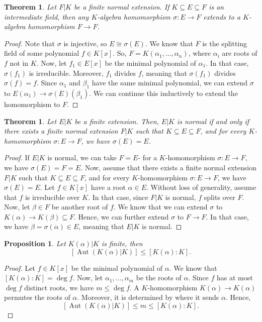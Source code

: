 \documentclass[a4paper, openany]{memoir}
\theoremstyle{definition}
\theoremstyle{plain}
\newtheorem{theorem}[definition]{Theorem}
\newtheorem{proposition}[definition]{Proposition}
\begin{document}
    \begin{theorem}
        Let $F|K$ be a finite normal extension. If $K \subseteq E \subseteq F$ is an intermediate field, then any $K$-algebra homomorphism $\sigma \colon E \to F$ extends to a $K$-algebra homomorphism $F \to F$.
    \end{theorem}
    \begin{proof}
        Note that $\sigma$ is injective, so $E \cong \sigma(E)$. We know that $F$ is the splitting field of some polynomial $f \in K[x]$. So, $F = K(\alpha_1, \dots, \alpha_n)$, where $\alpha_i$ are roots of $f$ not in $K$. Now, let $f_1 \in E[x]$ be the minimal polynomial of $\alpha_1$. In that case, $\sigma(f_1)$ is irreducible. Moreover, $f_1$ divides $f$, meaning that $\sigma(f_1)$ divides $\sigma(f) = f$. Since $\alpha_1$ and $\beta_1$ have the same minimal polynomial, we can extend $\sigma$ to $E(\alpha_1) \to \sigma(E)(\beta_1)$. We can continue this inductively to extend the homomorphism to $F$.
    \end{proof}

    \begin{theorem}
        Let $E|K$ be a finite extension. Then, $E|K$ is normal if and only if there exists a finite normal extension $F|K$ such that $K \subseteq E \subseteq F$, and for every $K$-homomorphism $\sigma \colon E \to F$, we have $\sigma(E) = E$.
    \end{theorem}
    \begin{proof}
        If $E|K$ is normal, we can take $F = E$- for a $K$-homomorphism $\sigma \colon E \to F$, we have $\sigma(E) = F = E$. Now, assume that there exists a finite normal extension $F|K$ such that $K \subseteq E \subseteq F$, and for every $K$-homomorphism $\sigma \colon E \to F$, we have $\sigma(E) = E$. Let $f \in K[x]$ have a root $\alpha \in E$. Without loss of generality, assume that $f$ is irreducible over $K$. In that case, since $F|K$ is normal, $f$ splits over $F$. Now, let $\beta \in F$ be another root of $f$. We know that we can extend $\sigma$ to $K(\alpha) \to K(\beta) \subseteq F$. Hence, we can further extend $\sigma$ to $F \to F$. In that case, we have $\beta = \sigma(\alpha) \in E$, meaning that $E|K$ is normal.
    \end{proof}

    \begin{proposition}
        Let $K(\alpha)|K$ is finite, then 
        \[[\operatorname{Aut} (K(\alpha) | K)] \leq [K(\alpha) : K].\]
    \end{proposition}
    \begin{proof}
        Let $f \in K[x]$ be the minimal polynomial of $\alpha$. We know that $[K(\alpha) : K] = \deg f$. Now, let $\alpha_1, \dots, \alpha_m$ be the roots of $\alpha$. Since $f$ has at most $\deg f$ distinct roots, we have $m \leq \deg f$. A $K$-homomorphism $K(\alpha) \to K(\alpha)$ permutes the roots of $\alpha$. Moreover, it is determined by where it sends $\alpha$. Hence, 
        \[[\operatorname{Aut} (K(\alpha) | K)] \leq m \leq [K(\alpha) : K].\]
    \end{proof}
\end{document}
